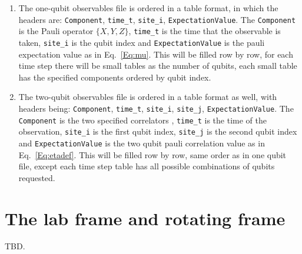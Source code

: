 \documentclass[aps,10pt,pra,twocolumn,groupedaddress,floatfix,superscriptaddress,showpacs,showkeys,amsfonts]{revtex4-2}
\newcommand{\eq}[1]{Eq.~\eqref{#1}}
\begin{document}
\begin{enumerate}
\item The one-qubit observables file is ordered in a table format, in which the headers are: \verb|Component|, \verb|time_t|, \verb|site_i|, \verb|ExpectationValue|. The \verb|Component| is the Pauli operator $\{X,Y,Z\}$, \verb|time_t| is the time that the observable is taken, \verb|site_i| is the qubit index and \verb|ExpectationValue| is the pauli expectation value as in \eq{Eq:mu}. This will be filled row by row, for each time step there will be small tables as the number of qubits, each small table has the specified components ordered by qubit index.

\item The two-qubit observables file is ordered in a table format as well, with headers being: \verb|Component|, \verb|time_t|, \verb|site_i|, \verb|site_j|, \verb|ExpectationValue|. The \verb|Component| is the two specified correlators , \verb|time_t| is the time of the observation, \verb|site_i| is the first qubit index, \verb|site_j| is the second qubit index and \verb|ExpectationValue| is the two qubit pauli correlation value as in \eq{Eq:etadef}. This will be filled row by row, same order as in one qubit file, except each time step table  has all possible combinations of qubits requested.
\end{enumerate}

\section{The lab frame and rotating frame}\label{App:Frame}

TBD.
\end{document}
